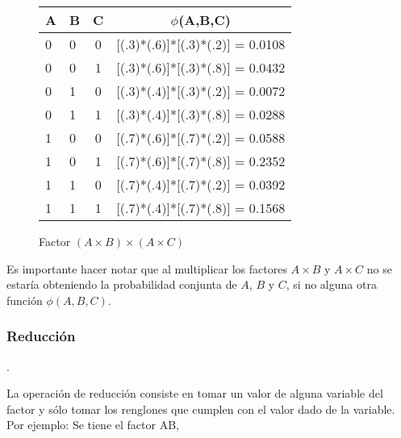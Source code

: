 \begin{figure}[H]
  \begin{center}
    \begin{tabular}{ l  l  c | c }
      A & B & C & $\phi$(A,B,C)\\ \hline
      0 & 0 & 0 & [(.3)*(.6)]*[(.3)*(.2)] = 0.0108  \\ \hline
      0 & 0 & 1 & [(.3)*(.6)]*[(.3)*(.8)] = 0.0432 \\ \hline
      0 & 1 & 0 & [(.3)*(.4)]*[(.3)*(.2)] = 0.0072 \\ \hline
      0 & 1 & 1 & [(.3)*(.4)]*[(.3)*(.8)] = 0.0288 \\ \hline
      1 & 0 & 0 & [(.7)*(.6)]*[(.7)*(.2)] = 0.0588 \\ \hline
      1 & 0 & 1 & [(.7)*(.6)]*[(.7)*(.8)] = 0.2352 \\ \hline
      1 & 1 & 0 & [(.7)*(.4)]*[(.7)*(.2)] = 0.0392 \\ \hline
      1 & 1 & 1 & [(.7)*(.4)]*[(.7)*(.8)] = 0.1568 \\ 
    \end{tabular}
  \end{center}
  \caption{Factor $(A \times B) \times (A \times C)$}
  \label{fig:FactorABC}
\end{figure}

Es importante hacer notar que al multiplicar los factores $A \times B$ y $A \times C$ no se estaría obteniendo la probabilidad conjunta de $A$, $B$ y $C$, si no alguna otra función $\phi(A,B,C)$. 

\subsubsection{Reducción}

\begin{definition}[Reducción]

\parencite[111]{KollerFriedman2009}.
\end{definition}

La operación de reducción consiste en tomar un valor de alguna variable del factor y sólo tomar los renglones que cumplen con el valor dado de la variable. Por ejemplo: Se tiene el factor AB,


